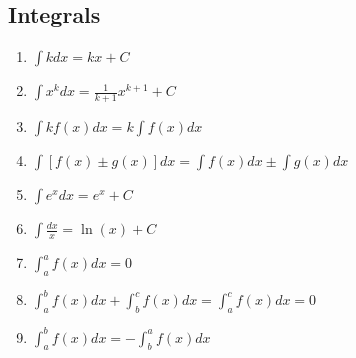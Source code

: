 \documentclass[letterpaper,12pt,fleqn]{article}
\begin{document}
\subsection*{Integrals}

\begin{enumerate}[left=0pt]
  \setlength{\itemsep}{5pt}
\item \(\displaystyle\int kdx=kx+C\)
\item \(\displaystyle\int x^kdx=\frac{1}{k+1}x^{k+1}+C\)
\item \(\displaystyle\int kf(x)dx=k\int f(x)dx\)
\item \(\displaystyle\int[f(x)\pm g(x)]dx=\int f(x)dx\pm\int g(x)dx\)
\item \(\displaystyle\int e^xdx=e^x+C\)
\item \(\displaystyle\int \frac{dx}{x}=\ln(x)+C\)
\item \(\displaystyle\int_a^af(x)dx=0\)
\item \(\displaystyle\int_a^bf(x)dx+\int_b^cf(x)dx=\int_a^cf(x)dx=0\)
\item \(\displaystyle\int_a^bf(x)dx=-\int_b^af(x)dx\)
\end{enumerate}
\end{document}
